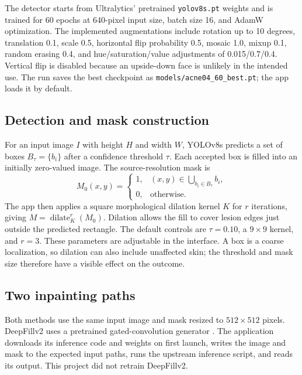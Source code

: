 \documentclass[10pt,twocolumn,letterpaper]{article}
\begin{document}
The detector starts from Ultralytics' pretrained \texttt{yolov8s.pt}
weights and is trained for 60 epochs at 640-pixel input size, batch size
16, and AdamW optimization. The implemented augmentations include
rotation up to 10 degrees, translation 0.1, scale 0.5, horizontal flip
probability 0.5, mosaic 1.0, mixup 0.1, random erasing 0.4, and
hue/saturation/value adjustments of 0.015/0.7/0.4. Vertical flip is
disabled because an upside-down face is unlikely in the intended use.
The run saves the best checkpoint as
\texttt{models/acne04\_60\_best.pt}; the app loads it by default.

\subsection{Detection and mask construction}
\label{sec:mask}

For an input image $I$ with height $H$ and width $W$, YOLOv8s predicts a
set of boxes $B_{\tau}=\{b_i\}$ after a confidence threshold $\tau$.
Each accepted box is filled into an initially zero-valued image. The
source-resolution mask is
\begin{equation}
M_0(x,y)=
\begin{cases}
1,& (x,y)\in \bigcup_{b_i\in B_{\tau}} b_i,\\
0,& \text{otherwise}.
\end{cases}
\end{equation}
The app then applies a square morphological dilation kernel $K$ for $r$
iterations, giving $M=\operatorname{dilate}_{K}^{r}(M_0)$. Dilation allows
the fill to cover lesion edges just outside the predicted rectangle.
The default controls are $\tau=0.10$, a $9\times9$ kernel, and $r=3$.
These parameters are adjustable in the interface. A box is a coarse
localization, so dilation can also include unaffected skin; the threshold
and mask size therefore have a visible effect on the outcome.

\subsection{Two inpainting paths}

Both methods use the same input image and mask resized to
$512\times512$ pixels. DeepFillv2 uses a pretrained gated-convolution
generator \cite{yu2019}. The application downloads its inference code and
weights on first launch, writes the image and mask to the expected input
paths, runs the upstream inference script, and reads its output. This
project did not retrain DeepFillv2.
\end{document}
